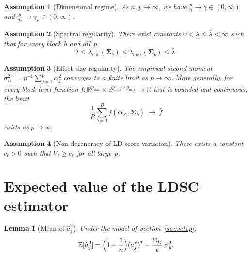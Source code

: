 \documentclass[11pt]{article}
\newcommand{\R}{\mathbb{R}}
\newcommand{\E}{\mathbb{E}}
\newcommand{\bSig}{\bm{\Sigma}}
\newcommand{\bal}{\bm{\alpha}}
\newtheorem{lemma}[theorem]{Lemma}
\newtheorem{assumption}{Assumption}[section]
\begin{document}
\begin{assumption}[Dimensional regime]\label{ass:regime}
As $n,p\to\infty$, we have
$\displaystyle\frac{p}{n}\to\gamma\in(0,\infty)$
and
$\displaystyle\frac{p}{n_r}\to\gamma_r\in(0,\infty)$.
\end{assumption}

\begin{assumption}[Spectral regularity]\label{ass:spectral}
There exist constants $0<\underline\lambda\le\bar\lambda<\infty$ such that for
every block~$b$ and all~$p$,
\[
  \underline\lambda\le\lambda_{\min}(\bSig_b)
  \le\lambda_{\max}(\bSig_b)\le\bar\lambda.
\]
\end{assumption}

\begin{assumption}[Effect-size regularity]\label{ass:effects}
The empirical second moment
$\sigma_\alpha^{2,\circ}=p^{-1}\sum_{j=1}^{p}\alpha_j^{2}$ converges to a
finite limit as $p\to\infty$.  More generally, for every block-level function
$f:\R^{p_{\max}}\times\R^{p_{\max}\times p_{\max}}\to\R$ that is bounded
and continuous, the limit
\[
  \frac{1}{B}\sum_{b=1}^{B}f(\bal_{S_b},\bSig_b)
  \;\longrightarrow\; \bar{f}
\]
exists as $p\to\infty$.
\end{assumption}

\begin{assumption}[Non-degeneracy of LD-score variation]\label{ass:ldvar}
There exists a constant $c_\ell>0$ such that $V_\ell\ge c_\ell$ for all
large~$p$.
\end{assumption}

\section{Expected value of the LDSC estimator}\label{sec:mean}

\begin{lemma}[Mean of $\hat{a}_j^{2}$]\label{lem:Eaj2}
Under the model of Section~\ref{sec:setup},
\begin{equation}\label{eq:Eaj2}
  \E[\hat{a}_j^{2}]
  = \Bigl(1+\frac{1}{n}\Bigr)(a_j^{*})^{2}
    + \frac{\Sigma_{jj}}{n}\,\sigma_y^{2}.
\end{equation}
\end{lemma}
\end{document}
